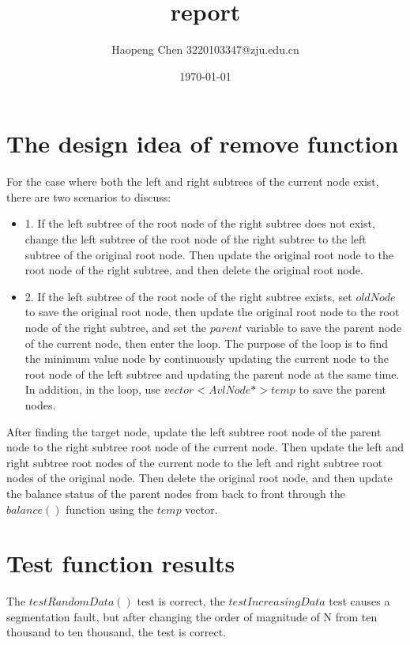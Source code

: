 \documentclass[a4paper]{article}
\begin{document}
\title{report}
\author{Haopeng Chen 3220103347@zju.edu.cn}
\date{\today}
\maketitle
\section*{The design idea of remove function}
For the case where both the left and right subtrees of the current node exist, there are two scenarios to discuss:
\begin{itemize}
\item 1. If the left subtree of the root node of the right subtree does not exist, change the left subtree of the root node of the right subtree to the left subtree of the original root node. Then update the original root node to the root node of the right subtree, and then delete the original root node.

\item 2. If the left subtree of the root node of the right subtree exists, set $oldNode$ to save the original root node, then update the original root node to the root node of the right subtree, and set the $parent$ variable to save the parent node of the current node, then enter the loop. The purpose of the loop is to find the minimum value node by continuously updating the current node to the root node of the left subtree and updating the parent node at the same time. In addition, in the loop, use $vector<AvlNode*>temp$ to save the parent nodes.
\end{itemize}
After finding the target node, update the left subtree root node of the parent node to the right subtree root node of the current node. Then update the left and right subtree root nodes of the current node to the left and right subtree root nodes of the original node. Then delete the original root node, and then update the balance status of the parent nodes from back to front through the $balance()$ function using the $temp$ vector.

\section*{Test function results}
The $testRandomData()$ test is correct, the $testIncreasingData$ test causes a segmentation fault, but after changing the order of magnitude of N from ten thousand to ten thousand, the test is correct.
\end{document}
